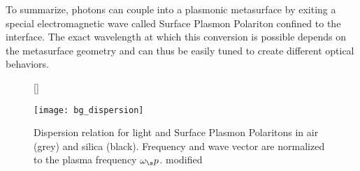 \indent
To summarize, photons can couple into a plasmonic metasurface by exiting a special electromagnetic wave called Surface Plasmon Polariton confined to the interface. The exact wavelength at which this conversion is possible depends on the metasurface geometry and can thus be easily tuned to create different optical behaviors.

\begin{figure}[H]
    [\FBwidth]
    {\caption{
        Dispersion relation for light and Surface Plasmon Polaritons in air (grey) and silica (black). Frequency and wave vector are normalized to the plasma frequency $\omega_\s p$. \cite{Maier2007} modified
    }
    \label{fig:bg:dispersion}}
    {\texttt{[image: bg\_dispersion]}}
\end{figure}